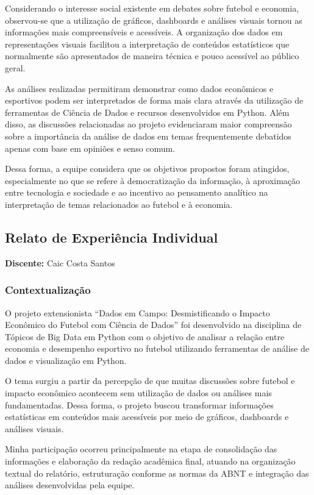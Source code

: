 \documentclass[12pt, a4paper, brazil]{article}
\begin{document}
Considerando o interesse social existente em debates sobre futebol e economia, observou-se que a utilização de gráficos, dashboards e análises visuais tornou as informações mais compreensíveis e acessíveis. A organização dos dados em representações visuais facilitou a interpretação de conteúdos estatísticos que normalmente são apresentados de maneira técnica e pouco acessível ao público geral.

As análises realizadas permitiram demonstrar como dados econômicos e esportivos podem ser interpretados de forma mais clara através da utilização de ferramentas de Ciência de Dados e recursos desenvolvidos em Python. Além disso, as discussões relacionadas ao projeto evidenciaram maior compreensão sobre a importância da análise de dados em temas frequentemente debatidos apenas com base em opiniões e senso comum.

Dessa forma, a equipe considera que os objetivos propostos foram atingidos, especialmente no que se refere à democratização da informação, à aproximação entre tecnologia e sociedade e ao incentivo ao pensamento analítico na interpretação de temas relacionados ao futebol e à economia.

\subsection{Relato de Experiência Individual}
\textbf{Discente:} Caic Costa Santos

\subsubsection{Contextualização}
O projeto extensionista “Dados em Campo: Desmistificando o Impacto Econômico do Futebol com Ciência de Dados” foi desenvolvido na disciplina de Tópicos de Big Data em Python com o objetivo de analisar a relação entre economia e desempenho esportivo no futebol utilizando ferramentas de análise de dados e visualização em Python.

O tema surgiu a partir da percepção de que muitas discussões sobre futebol e impacto econômico acontecem sem utilização de dados ou análises mais fundamentadas. Dessa forma, o projeto buscou transformar informações estatísticas em conteúdos mais acessíveis por meio de gráficos, dashboards e análises visuais.

Minha participação ocorreu principalmente na etapa de consolidação das informações e elaboração da redação acadêmica final, atuando na organização textual do relatório, estruturação conforme as normas da ABNT e integração das análises desenvolvidas pela equipe.
\end{document}
